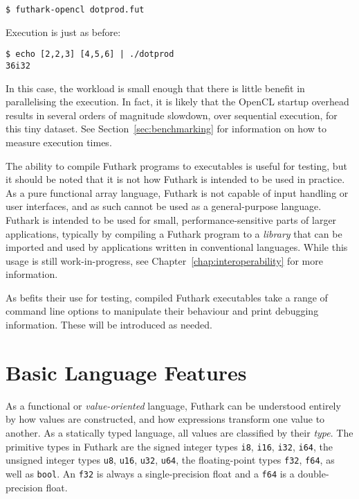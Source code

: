 \documentclass[oneside,11pt]{book}
\begin{document}
\begin{verbatim}
$ futhark-opencl dotprod.fut
\end{verbatim}

\noindent
Execution is just as before:

\begin{verbatim}
$ echo [2,2,3] [4,5,6] | ./dotprod
36i32
\end{verbatim}

In this case, the workload is small enough that there is little
benefit in parallelising the execution.  In fact, it is likely that
the OpenCL startup overhead results in several orders of magnitude
slowdown, over sequential execution, for this tiny dataset.  See
Section~\ref{sec:benchmarking} for information on how to measure
execution times.

The ability to compile Futhark programs to executables is useful for
testing, but it should be noted that it is not how Futhark is intended
to be used in practice.  As a pure functional array language, Futhark
is not capable of input handling or user interfaces, and as such
cannot be used as a general-purpose language.  Futhark is intended to
be used for small, performance-sensitive parts of larger applications,
typically by compiling a Futhark program to a \textit{library} that
can be imported and used by applications written in conventional
languages.  While this usage is still work-in-progress, see
Chapter~\ref{chap:interoperability} for more information.

As befits their use for testing, compiled Futhark executables take a
range of command line options to manipulate their behaviour and print
debugging information.  These will be introduced as needed.

\section{Basic Language Features}
\label{sec:baselang}
As a functional or \textit{value-oriented} language, Futhark can be
understood entirely by how values are constructed, and how expressions
transform one value to another.  As a statically typed language, all
values are classified by their \textit{type}.  The primitive types in
Futhark are the signed integer types \texttt{i8}, \texttt{i16},
\texttt{i32}, \texttt{i64}, the unsigned integer types \texttt{u8},
\texttt{u16}, \texttt{u32}, \texttt{u64}, the floating-point types
\texttt{f32}, \texttt{f64}, as well as \texttt{bool}.  An \texttt{f32}
is always a single-precision float and a \texttt{f64} is a
double-precision float.
\end{document}
